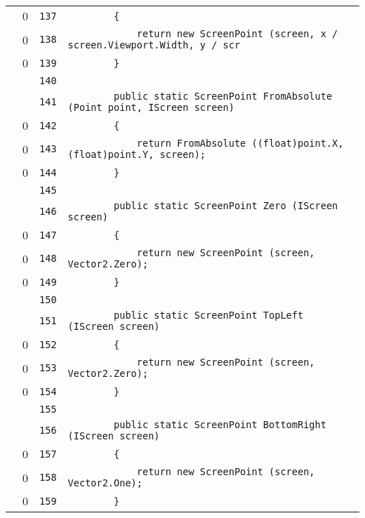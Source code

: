 \documentclass[a4paper,10pt]{article}
\begin{document}
\begin{longtable}[l]{lrrl}
\cellcolor{red} & 0 & \verb~137~ & \verb~        {~\\
\cellcolor{red} & 0 & \verb~138~ & \verb~            return new ScreenPoint (screen, x / screen.Viewport.Width, y / scr~\\
\cellcolor{red} & 0 & \verb~139~ & \verb~        }~\\
\cellcolor{gray} &  & \verb~140~ & \verb~~\\
\cellcolor{gray} &  & \verb~141~ & \verb~        public static ScreenPoint FromAbsolute (Point point, IScreen screen)~\\
\cellcolor{red} & 0 & \verb~142~ & \verb~        {~\\
\cellcolor{red} & 0 & \verb~143~ & \verb~            return FromAbsolute ((float)point.X, (float)point.Y, screen);~\\
\cellcolor{red} & 0 & \verb~144~ & \verb~        }~\\
\cellcolor{gray} &  & \verb~145~ & \verb~~\\
\cellcolor{gray} &  & \verb~146~ & \verb~        public static ScreenPoint Zero (IScreen screen)~\\
\cellcolor{red} & 0 & \verb~147~ & \verb~        {~\\
\cellcolor{red} & 0 & \verb~148~ & \verb~            return new ScreenPoint (screen, Vector2.Zero);~\\
\cellcolor{red} & 0 & \verb~149~ & \verb~        }~\\
\cellcolor{gray} &  & \verb~150~ & \verb~~\\
\cellcolor{gray} &  & \verb~151~ & \verb~        public static ScreenPoint TopLeft (IScreen screen)~\\
\cellcolor{red} & 0 & \verb~152~ & \verb~        {~\\
\cellcolor{red} & 0 & \verb~153~ & \verb~            return new ScreenPoint (screen, Vector2.Zero);~\\
\cellcolor{red} & 0 & \verb~154~ & \verb~        }~\\
\cellcolor{gray} &  & \verb~155~ & \verb~~\\
\cellcolor{gray} &  & \verb~156~ & \verb~        public static ScreenPoint BottomRight (IScreen screen)~\\
\cellcolor{red} & 0 & \verb~157~ & \verb~        {~\\
\cellcolor{red} & 0 & \verb~158~ & \verb~            return new ScreenPoint (screen, Vector2.One);~\\
\cellcolor{red} & 0 & \verb~159~ & \verb~        }~\\

\end{longtable}
\end{document}

